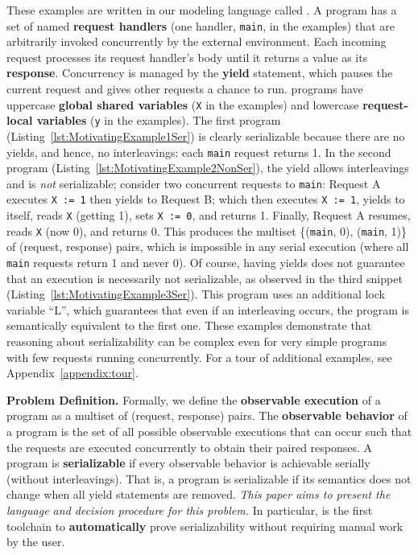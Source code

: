 These examples are written in our modeling language called \toolname.
A \toolname{} program has a set of named \textbf{request handlers} (one handler, \texttt{main}, in the examples) that are arbitrarily invoked concurrently by the external environment.
Each incoming request processes its request handler's body until it returns a value as its \textbf{response}. Concurrency is managed by the \textbf{yield} statement, which pauses the current request and gives other requests a chance to run. \toolname{} programs have uppercase \textbf{global shared variables} (\texttt{X} in the examples) and lowercase \textbf{request-local variables} (\texttt{y} in the examples).
%
%
%
The first program (Listing~\ref{lst:MotivatingExample1Ser}) is clearly serializable because there are no yields, and hence, no interleavings: each \texttt{main} request returns 1.
In the second program (Listing~\ref{lst:MotivatingExample2NonSer}), the yield allows interleavings and is \emph{not} serializable; consider two concurrent requests to \texttt{main}:
Request A executes \texttt{X := 1} then yields to Request B; which then
executes \texttt{X := 1}, yields to itself, reads \texttt{X} (getting 1), sets \texttt{X := 0}, and returns 1.
Finally, 
Request A resumes, reads \texttt{X} (now 0), and returns 0.
This produces the multiset \{(\texttt{main}, 0), (\texttt{main}, 1)\} of (request, response) pairs, which is impossible in any serial execution (where all \texttt{main} requests return 1 and never 0).
Of course, having yields does not guarantee that an execution is necessarily not serializable, as observed in the third snippet (Listing~\ref{lst:MotivatingExample3Ser}). This program uses an additional lock variable ``L'', which guarantees that even if an interleaving occurs, the program is semantically equivalent to the first one.
%
These examples demonstrate that reasoning about serializability can be complex even for very simple programs with few requests running concurrently.
%
For a tour of additional examples, see Appendix~\ref{appendix:tour}.

\smallskip
\noindent
\textbf{Problem Definition.}
Formally, we define the \textbf{observable execution} of a \toolname{} program as a multiset of (request, response) pairs. The \textbf{observable behavior} of a \toolname{} program is the set of all possible observable executions that can occur such that the requests are executed concurrently to obtain their paired responses.
A program is \textbf{serializable} if every observable behavior is achievable serially (without interleavings). That is, a \toolname{} program is serializable if its semantics does not change when all yield statements are removed.
%
\emph{This paper aims to present the \toolname{} language and decision procedure for this problem.} In particular, \toolname{} is the first toolchain to \textbf{automatically} prove serializability without requiring manual work by the user.

